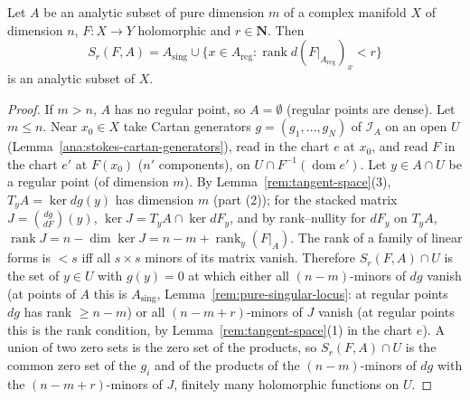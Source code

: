 \begin{lemma}
\label{rem:rank-degeneracy}
\leanok
Let \(A\) be an analytic subset of pure dimension \(m\) of a complex manifold \(X\) of dimension \(n\), \(F\colon X\to Y\) holomorphic and \(r\in\mathbf N\). Then
\[
 S_r(F,A)=A_{\mathrm{sing}}\cup\{x\in A_{\mathrm{reg}}:\operatorname{rank}d(F|_{A_{\mathrm{reg}}})_x<r\}
\]
is an analytic subset of \(X\).
\end{lemma}
\begin{proof}
\leanok
If \(m>n\), \(A\) has no regular point, so \(A=\emptyset\) (regular points are dense). Let \(m\le n\). Near \(x_0\in X\) take Cartan generators \(g=(g_1,\dots,g_N)\)
of \(\mathcal I_A\) on an open \(U\) (Lemma~\ref{ana:stokes-cartan-generators}), read in the chart \(e\) at \(x_0\), and read \(F\) in the chart \(e'\) at \(F(x_0)\)
(\(n'\) components), on \(U\cap F^{-1}(\operatorname{dom}e')\). Let \(y\in A\cap U\) be a regular point (of dimension \(m\)). By
Lemma~\ref{rem:tangent-space}(3), \(T_yA=\ker dg(y)\) has dimension \(m\) (part (2)); for the stacked matrix \(J=\binom{dg}{dF}(y)\),
\(\ker J=T_yA\cap\ker dF_y\), and by rank--nullity for \(dF_y\) on \(T_yA\), \(\operatorname{rank}J=n-\dim\ker J=n-m+\operatorname{rank}_y(F|_A)\). The rank of a
family of linear forms is \(<s\) iff all \(s\times s\) minors of its matrix vanish. Therefore \(S_r(F,A)\cap U\) is the set of \(y\in U\) with \(g(y)=0\) at which
either all \((n-m)\)-minors of \(dg\) vanish (at points of \(A\) this is \(A_{\mathrm{sing}}\), Lemma~\ref{rem:pure-singular-locus}: at regular points \(dg\) has
rank \(\ge n-m\)) or all \((n-m+r)\)-minors of \(J\) vanish (at regular points this is the rank condition, by Lemma~\ref{rem:tangent-space}(1) in the chart
\(e\)). A union of two zero sets is the zero set of the products, so \(S_r(F,A)\cap U\) is the common zero set of the \(g_i\) and of the products of the
\((n-m)\)-minors of \(dg\) with the \((n-m+r)\)-minors of \(J\), finitely many holomorphic functions on \(U\).
\end{proof}

